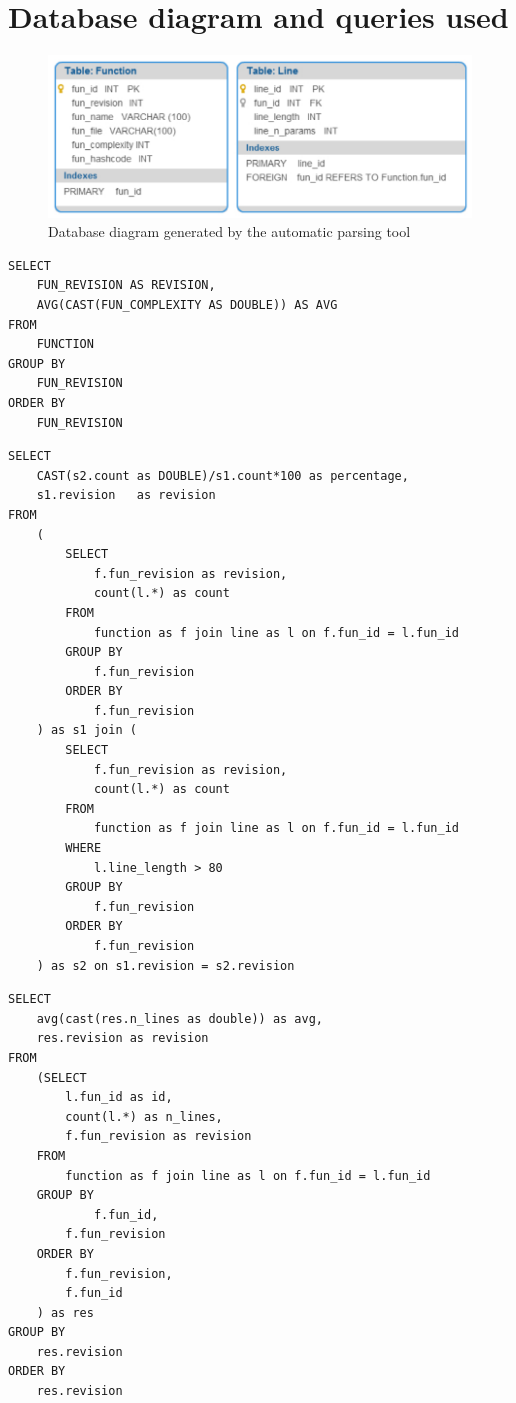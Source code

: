 \chapter{Database diagram and queries used} \label{app:database}

\begin{figure}[!htbp]
    \centering
    \includegraphics[width=\textwidth,keepaspectratio]{figure/methods/database_diagram.pdf}
    \caption{Database diagram generated by the automatic parsing tool}
    \label{fig:database_diagram}
\end{figure}

\begin{listing}[htbp]
\begin{verbatim}
SELECT 
    FUN_REVISION AS REVISION,
    AVG(CAST(FUN_COMPLEXITY AS DOUBLE)) AS AVG
FROM 
    FUNCTION 
GROUP BY 
    FUN_REVISION 
ORDER BY 
    FUN_REVISION
\end{verbatim}
\caption{Query to calculate the revision based average complexity}
\label{listing:avg_complexity_query}
\end{listing}

\begin{listing}[htbp]
\begin{verbatim}
SELECT
    CAST(s2.count as DOUBLE)/s1.count*100 as percentage,
    s1.revision   as revision
FROM
	(
		SELECT 
		    f.fun_revision as revision,
		    count(l.*) as count
		FROM
		    function as f join line as l on f.fun_id = l.fun_id
		GROUP BY
			f.fun_revision
		ORDER BY  
			f.fun_revision
	) as s1 join (
		SELECT 
		    f.fun_revision as revision,
		    count(l.*) as count
		FROM
		    function as f join line as l on f.fun_id = l.fun_id
		WHERE 
			l.line_length > 80
		GROUP BY  
			f.fun_revision
		ORDER BY  
			f.fun_revision
	) as s2 on s1.revision = s2.revision
\end{verbatim}
\caption{Query to calculate the percentage of complex statements on a revision basis}
\label{listing:percentage_complex_statements}
\end{listing}


\begin{listing}[htbp]
\begin{verbatim}
SELECT
	avg(cast(res.n_lines as double)) as avg,
	res.revision as revision
FROM
	(SELECT
		l.fun_id as id, 
		count(l.*) as n_lines, 
		f.fun_revision as revision
	FROM
		function as f join line as l on f.fun_id = l.fun_id
	GROUP BY
	        f.fun_id,
		f.fun_revision
	ORDER BY
		f.fun_revision,
		f.fun_id
	) as res
GROUP BY 
	res.revision
ORDER BY
	res.revision
\end{verbatim}
\caption{Query to calculate the average function length (LOC) on a commit basis}
\label{listing:avg_length_query}
\end{listing}